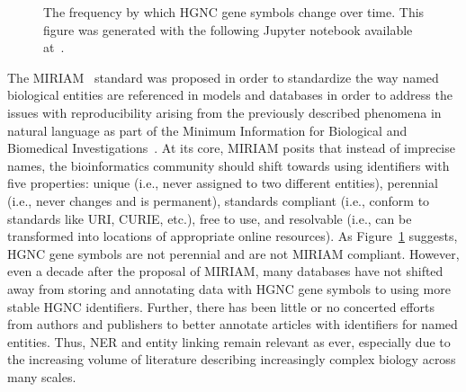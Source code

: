 \begin{figure}
    \captionsetup{format=plain}
    \caption[HGNC Gene Symbol Half Lives]{The frequency by which \ac{HGNC} gene symbols change over time. This figure was generated with the following Jupyter notebook available at~\cite{Hoyt2018GeneHalfLife}.}
    \label{fig:gene_symbol_half_life}
\end{figure}

The \ac{MIRIAM}~\cite{Laibe2007} standard was proposed in order to standardize the way named biological entities are referenced in models and databases in order to address the issues with reproducibility arising from the previously described phenomena in natural language as part of the Minimum Information for Biological and Biomedical Investigations~\cite{Taylor2008}.
At its core, \ac{MIRIAM} posits that instead of imprecise names, the bioinformatics community should shift towards using identifiers with five properties: unique (i.e., never assigned to two different entities), perennial (i.e., never changes and is permanent), standards compliant (i.e., conform to standards like \ac{URI}, \ac{CURIE}, etc.), free to use, and resolvable (i.e., can be transformed into locations of appropriate online resources).
As Figure~\ref{fig:gene_symbol_half_life} suggests, \ac{HGNC} gene symbols are not perennial and are not \ac{MIRIAM} compliant.
However, even a decade after the proposal of \ac{MIRIAM}, many databases have not shifted away from storing and annotating data with \ac{HGNC} gene symbols to using more stable \ac{HGNC} identifiers.
Further, there has been little or no concerted efforts from authors and publishers to better annotate articles with identifiers for named entities.
Thus, \ac{NER} and entity linking remain relevant as ever, especially due to the increasing volume of literature describing increasingly complex biology across many scales.
